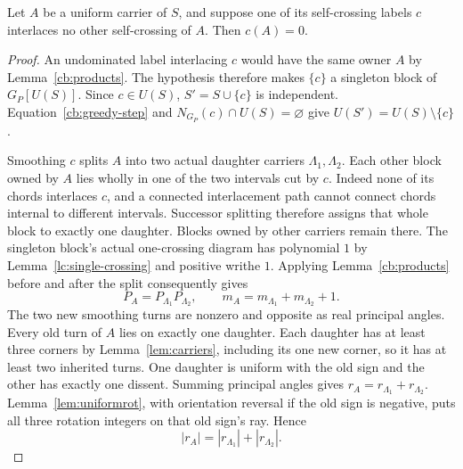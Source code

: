 \begin{lemma}
\label{cb:singleton}
Let $A$ be a uniform carrier of $S$, and suppose one of its self-crossing
labels $c$ interlaces no other self-crossing of $A$. Then $c(A)=0$.
\end{lemma}
\begin{proof}
An undominated label interlacing $c$ would have the same owner $A$ by
Lemma~\ref{cb:products}. The hypothesis therefore makes $\{c\}$ a
singleton block of $G_P[U(S)]$. Since $c\in U(S)$,
$S'=S\cup\{c\}$ is independent. Equation~\eqref{cb:greedy-step} and
$N_{G_P}(c)\cap U(S)=\varnothing$ give $U(S')=U(S)\setminus\{c\}$.

Smoothing $c$ splits $A$ into two actual daughter carriers
$\Lambda_1,\Lambda_2$. Each other block owned by $A$ lies wholly in
one of the two intervals cut by $c$. Indeed none of its chords
interlaces $c$, and a connected interlacement path cannot connect
chords internal to different intervals. Successor splitting therefore
assigns that whole block to exactly one daughter. Blocks owned by
other carriers remain there. The singleton block's actual one-crossing
diagram has polynomial $1$ by Lemma~\ref{lc:single-crossing} and
positive writhe $1$. Applying Lemma~\ref{cb:products} before and after
the split consequently gives
\begin{equation}\label{cb:singleton-products}
 P_A=P_{\Lambda_1}P_{\Lambda_2},\qquad
 m_A=m_{\Lambda_1}+m_{\Lambda_2}+1.
\end{equation}
The two new smoothing turns are nonzero and opposite as real principal
angles. Every old turn of $A$ lies on exactly one daughter. Each
daughter has at least three corners by Lemma~\ref{lem:carriers},
including its one new corner, so it has at least two inherited turns.
One daughter is uniform with the old sign and the other has exactly
one dissent. Summing principal angles gives
$r_A=r_{\Lambda_1}+r_{\Lambda_2}$. Lemma~\ref{lem:uniformrot}, with
orientation reversal if the old sign is negative, puts all three
rotation integers on that old sign's ray. Hence
\begin{equation}\label{cb:singleton-rotations}
 |r_A|=|r_{\Lambda_1}|+|r_{\Lambda_2}|.
\end{equation}


\end{proof}
